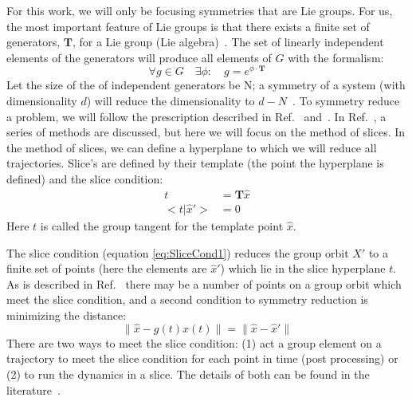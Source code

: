 \documentclass[10pt,letter]{article}
\begin{document}
For this work, we will only be focusing symmetries that are Lie groups.
For us, the most important feature of Lie groups is that there exists a
finite set of generators, $\mathbf{T}$, for a Lie group (Lie
algebra)~\cite{CB}.  The set of linearly independent elements of the
generators will produce all elements of $G$ with the formalism:
\begin{equation}
\forall g \in G \quad \exists \phi: \quad  g = e^{\phi \cdot \mathbf{T}}
\label{eq:SymmGen}
\end{equation}
Let the size of the of independent generators be N; a symmetry of a
system (with dimensionality $d$) will reduce the dimensionality to
$d-N$~\cite{Atl}.
To symmetry reduce a problem, we will follow the prescription described
in Ref.~\cite{SliceCond} and~\cite{Atl}.  In Ref.~\cite{Atl}, a series of
methods are discussed, but here we will focus on the method of slices.
In the method of slices, we can define a hyperplane to which we will
reduce all trajectories. Slice's are defined by their template (the point
the hyperplane is defined) and the slice condition:
\begin{equation}
\begin{split}
t &= \mathbf{T}  \hat{x} \\
<t|\hat{x}'> &= 0
\label{eq:SliceCond1}
\end{split}
\end{equation}
Here $t$ is called the group tangent for the template point $\hat{x}$.

The slice condition (equation \ref{eq:SliceCond1}) reduces the group
orbit ${X'}$ to a finite set of points (here the elements are
${\hat{x}'}$) which lie in the slice hyperplane $t$.  As is described in
Ref.~\cite{SliceCond} there may be a number of points on a group orbit
which meet the slice condition, and a second condition to symmetry
reduction is minimizing the distance:
\begin{equation}
\parallel \hat{x}-g(t)x(t) \parallel = \parallel \hat{x}-\hat{x}' \parallel
\label{eq:SliceCond2}
\end{equation}
There are two ways to meet the slice condition: (1) act a group element
on a trajectory to meet the slice condition for each point in time (post
processing) or (2) to run the dynamics in a slice.  The details of both
can be found in the literature~\cite{CB,Eth, SliceCond, Atl}.
\end{document}
